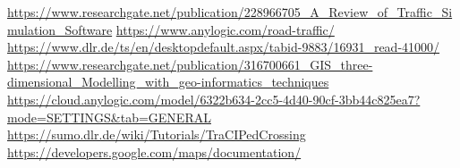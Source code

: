 
\begin{thebibliography}{x}

\url{https://www.researchgate.net/publication/228966705_A_Review_of_Traffic_Simulation_Software}
\url{https://www.anylogic.com/road-traffic/}
\url{https://www.dlr.de/ts/en/desktopdefault.aspx/tabid-9883/16931_read-41000/}
\url{https://www.researchgate.net/publication/316700661_GIS_three-dimensional_Modelling_with_geo-informatics_techniques}
\url{https://cloud.anylogic.com/model/6322b634-2cc5-4d40-90cf-3bb44c825ea7?mode=SETTINGS&tab=GENERAL}
\url{https://sumo.dlr.de/wiki/Tutorials/TraCIPedCrossing}
\url{https://developers.google.com/maps/documentation/}
\end{thebibliography}
